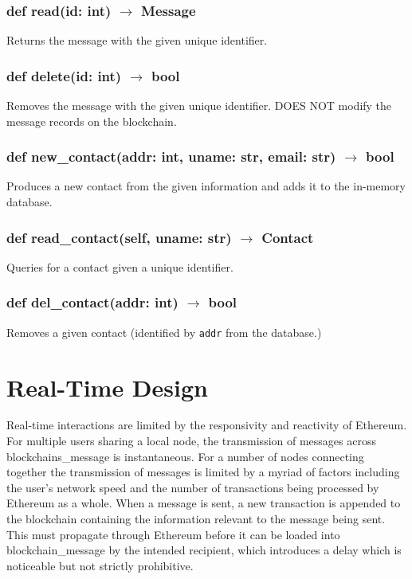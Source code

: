 \documentclass[titlepage]{report}
\begin{document}
\subsubsection{def read(id: int) $\rightarrow$ Message}
Returns the message with the given unique identifier.
\subsubsection{def delete(id: int) $\rightarrow$ bool}
Removes the message with the given unique identifier. DOES NOT modify the message records on the \gls{blockchain}.
\subsubsection{def new\_contact(addr: int, uname: str, email: str) $\rightarrow$ bool}
Produces a new contact from the given information and adds it to the in-memory database.
\subsubsection{def read\_contact(self, uname: str) $\rightarrow$ Contact}
Queries for a contact given a unique identifier.
\subsubsection{def del\_contact(addr: int) $\rightarrow$ bool}
Removes a given contact (identified by \texttt{addr} from the database.)

\section{Real-Time Design}
Real-time interactions are limited by the responsivity and reactivity of \gls{Ethereum}. For multiple users sharing a local node, the transmission of messages across blockchains\_message is instantaneous. For a number of nodes connecting together the transmission of messages is limited by a myriad of factors including the user's network speed and the number of transactions being processed by \gls{Ethereum} as a whole. When a message is sent, a new transaction is appended to the \gls{blockchain} containing the information relevant to the message being sent. This must propagate through \gls{Ethereum} before it can be loaded into blockchain\_message by the intended recipient, which introduces a delay which is noticeable but not strictly prohibitive.
\end{document}
